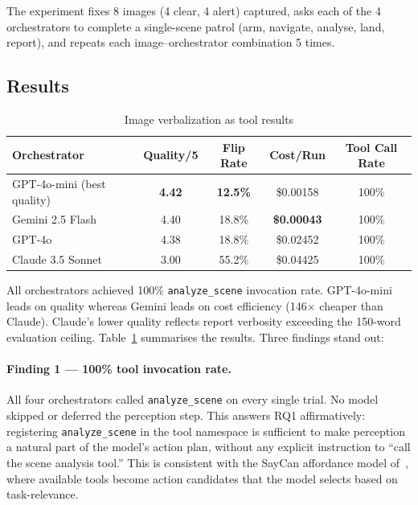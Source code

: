 The experiment fixes 8 images (4 clear, 4 alert) captured, asks each of the 4 orchestrators to complete a single-scene patrol (arm, navigate, analyse, land, report), and repeats each image--orchestrator combination 5 times.

\subsection{Results}
\label{sec:ch4_nd1_results}

\begin{table}[ht]
  \caption{Image verbalization as tool results}
  \label{tab:ch4_nd1}
  \centering
  \small
  \begin{tabular}{lcccc}
    \toprule
    Orchestrator & Quality/5 & Flip Rate & Cost/Run & Tool Call Rate \\
    \midrule
    GPT-4o-mini (best quality) & \textbf{4.42} & \textbf{12.5\%} & \$0.00158 & 100\% \\
    Gemini 2.5 Flash            & 4.40          & 18.8\%          & \textbf{\$0.00043} & 100\% \\
    GPT-4o                      & 4.38          & 18.8\%          & \$0.02452 & 100\% \\
    Claude 3.5 Sonnet           & 3.00          & 55.2\%          & \$0.04425 & 100\% \\
    \bottomrule
  \end{tabular}
\end{table}

All orchestrators achieved 100\% \texttt{analyze\_scene} invocation rate. 
GPT-4o-mini leads on quality whereas Gemini leads on cost efficiency (146$\times$ cheaper than Claude).  Claude's lower quality reflects report verbosity exceeding the 150-word evaluation ceiling.
Table~\ref{tab:ch4_nd1} summarises the results.
Three findings stand out:

\paragraph{Finding 1 --- 100\% tool invocation rate.}
All four orchestrators called \texttt{analyze\_scene} on every single trial.  
No model skipped or deferred the perception step.  This answers RQ1 affirmatively: registering
\texttt{analyze\_scene} in the tool namespace is sufficient to make perception a natural part of the model's action plan, without any explicit instruction to ``call the scene analysis tool.''  
This is consistent with the SayCan affordance model of~\citet{ahn2022saycan}, where available tools become action candidates that the model selects based on task-relevance.

